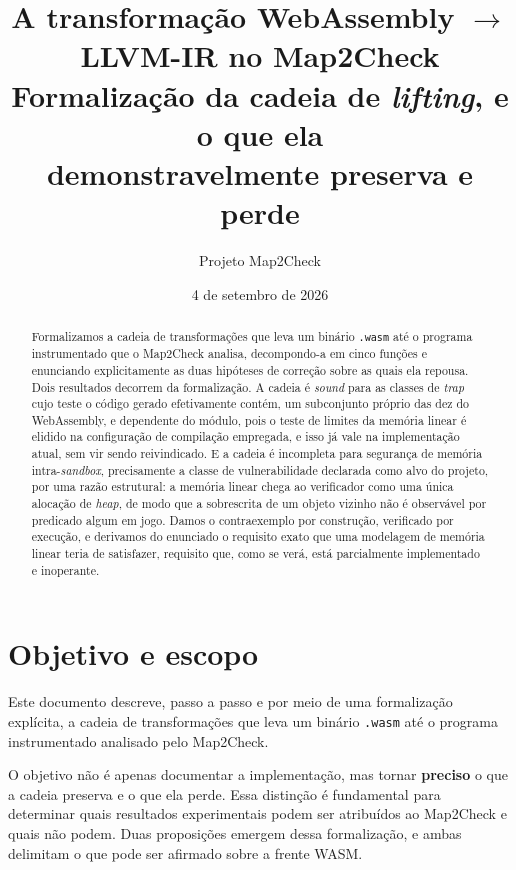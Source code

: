 \documentclass[11pt,a4paper]{article}
\title{\textbf{A transformação WebAssembly $\rightarrow$ LLVM-IR no Map2Check}\\[0.4em]
       \large Formalização da cadeia de \emph{lifting}, e o que ela\\
       demonstravelmente preserva e perde}
\author{Projeto Map2Check}
\date{4 de setembro de 2026}
\theoremstyle{definition}
\newcommand{\code}[1]{\texttt{#1}}
\begin{document}
\sloppy   %
\maketitle

\begin{abstract}
\noindent
Formalizamos a cadeia de transformações que leva um binário \code{.wasm} até o
programa instrumentado que o Map2Check analisa, decompondo-a em cinco funções e
enunciando explicitamente as duas hipóteses de correção sobre as quais ela
repousa. Dois resultados decorrem da formalização. A cadeia é \emph{sound} para
as classes de \emph{trap} cujo teste o código gerado efetivamente contém, um
subconjunto próprio das dez do WebAssembly, e dependente do módulo, pois o teste
de limites da memória linear é elidido na configuração de compilação empregada,
e isso já vale na implementação atual, sem vir sendo reivindicado. E a cadeia
é incompleta para segurança de memória intra-\emph{sandbox}, precisamente a
classe de vulnerabilidade declarada como alvo do projeto, por uma razão
estrutural: a memória linear chega ao verificador como uma única alocação de
\emph{heap}, de modo que a sobrescrita de um objeto vizinho não é observável por
predicado algum em jogo. Damos o contraexemplo por construção, verificado por
execução, e derivamos do enunciado o requisito exato que uma modelagem de memória
linear teria de satisfazer, requisito que, como se verá, está parcialmente
implementado e inoperante.
\end{abstract}

\tableofcontents
\bigskip

\section{Objetivo e escopo}

Este documento descreve, passo a passo e por meio de uma
formalização explícita, a cadeia de transformações que leva um binário
\code{.wasm} até o programa instrumentado analisado pelo Map2Check.

O objetivo não é apenas documentar a implementação, mas tornar
\textbf{preciso} o que a cadeia preserva e o que ela perde. Essa distinção é
fundamental para determinar quais resultados experimentais podem ser atribuídos
ao Map2Check e quais não podem. Duas proposições emergem dessa formalização, e
ambas delimitam o que pode ser afirmado sobre a frente WASM.
\end{document}
